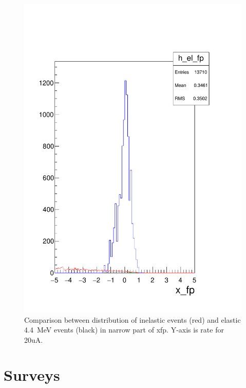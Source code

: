 \documentclass[]{article}
\begin{document}
\begin{figure}	
	\begin{center}
		\includegraphics[width=0.98\columnwidth]{shms_pointtarg_13p5deg_2gev_wc_mscat_vac_sieve_car44_xfp.pdf}
	\end{center}
	\caption{Comparison between distribution of inelastic events (red) and elastic 4.4~MeV events (black)
		 in narrow part of xfp. Y-axis is rate for 20uA.  }
	\label{fig:xfp}
\end{figure}


\section{Surveys}
\end{document}
